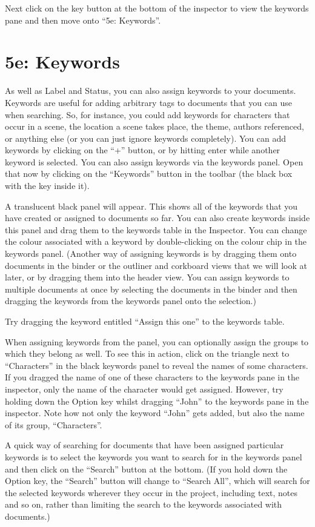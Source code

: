 \documentclass[10pt,oneside]{memoir}
\begin{document}
Next click on the key button at the bottom of the inspector to view the keywords pane and then move onto ``5e: Keywords''.


\pagebreak \section{5e: Keywords}
\label{e:keywords}

As well as Label and Status, you can also assign keywords to your documents. Keywords are useful for adding arbitrary tags to documents that you can use when searching. So, for instance, you could add keywords for characters that occur in a scene, the location a scene takes place, the theme, authors referenced, or anything else (or you can just ignore keywords completely). You can add keywords by clicking on the ``+'' button, or by hitting enter while another keyword is selected. You can also assign keywords via the keywords panel. Open that now by clicking on the ``Keywords'' button in the toolbar (the black box with the key inside it).


A translucent black panel will appear. This shows all of the keywords that you have created or assigned to documents so far. You can also create keywords inside this panel and drag them to the keywords table in the Inspector. You can change the colour associated with a keyword by double-clicking on the colour chip in the keywords panel. (Another way of assigning keywords is by dragging them onto documents in the binder or the outliner and corkboard views that we will look at later, or by dragging them into the header view. You can assign keywords to multiple documents at once by selecting the documents in the binder and then dragging the keywords from the keywords panel onto the selection.)


Try dragging the keyword entitled ``Assign this one'' to the keywords table.


When assigning keywords from the panel, you can optionally assign the groups to which they belong as well. To see this in action, click on the triangle next to ``Characters'' in the black keywords panel to reveal the names of some characters. If you dragged the name of one of these characters to the keywords pane in the inspector, only the name of the character would get assigned. However, try holding down the Option key whilst dragging ``John'' to the keywords pane in the inspector. Note how not only the keyword ``John'' gets added, but also the name of its group, ``Characters''.


A quick way of searching for documents that have been assigned particular keywords is to select the keywords you want to search for in the keywords panel and then click on the ``Search'' button at the bottom. (If you hold down the Option key, the ``Search'' button will change to ``Search All'', which will search for the selected keywords wherever they occur in the project, including text, notes and so on, rather than limiting the search to the keywords associated with documents.)
\end{document}
